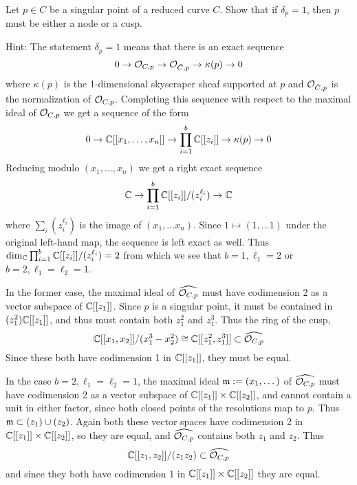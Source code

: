 \begin{exercise}\label{delta=1 characterization}
Let $p \in C$ be a singular point of a reduced curve $C$. Show that if $\delta_p = 1$, then $p$ must be either a node or a cusp.

Hint: The statement $\delta_p = 1$ means that there is an exact sequence
$$
0 \to \cO_{C,p} \to\cO_{\tilde C,p} \to \kappa(p) \to 0
$$
where $\kappa(p)$ is the 1-dimensional skyscraper sheaf supported at $p$ and $\cO_{\tilde C,p}$ is
the normalization of $\cO_{C,p}$. Completing this sequence with respect to the maximal ideal
of $\cO_{C,p}$ we get a sequence of the form
$$
0 \to \CC[[x_1,\dots,x_n]] \to \prod_{i=1}^b \CC[[z_i]] \to \kappa(p) \to 0
$$
Reducing modulo $(x_1,\dots,x_n)$ we get a right exact sequence
$$
\CC \to \prod_{i=1}^b \CC[[z_i]]/(z_i^{\ell_i}) \to \CC
$$
where $\sum_i (z_i^{\ell_i})$ is the image of $(x_1,\dots x_n)$.
Since $1\mapsto (1,...1)$ under the original left-hand map, the sequence is 
left exact as well. Thus
$\dim_\CC \prod_{i=1}^b \CC[[z_i]]/(z_i^{\ell_i})=2$
from which we see that $b=1, \ell_1 = 2$ or $b = 2, \ell_1=\ell_2 = 1$.

In the former case, the maximal ideal of $\widehat{\sO_{C,p}}$ must have codimension
2 as a vector subspace of $\CC[[z_1]]$. Since $p$ is a singular point, it must be contained in
$(z_1^2)\CC[[z_1]]$, and thus must contain both $z_1^2$ and $z_1^3$. Thus the
ring of the cusp, 
$$
\CC[[x_1,x_2]]/(x_1^3-x_2^2) \cong \CC[[z_1^2, z_1^3]]\subset \widehat{\sO_{C,p}}
$$ 
Since these
both have codimension 1 in $\CC[[z_1]]$, they must be equal.

In the case  $b = 2, \ell_1=\ell_2 = 1$, the maximal ideal $\gm := (x_1,\dots)$ of $\widehat{\sO_{C,p}}$ must have codimension
2 as a vector subspace of $\CC[[z_1]]\times \CC[[z_2]] $, and cannot contain a unit in either factor,
since both closed points of the resolutions map to  $p$. Thus $\gm\subset (z_1)\cup (z_2)$. Again
both these vector spaces have codimension 2 in $\CC[[z_1]]\times \CC[[z_2]] $, so they are
equal, and $\widehat{\sO_{C,p}}$ contains both $z_1$ and $z_2$. Thus
$$
\CC[[z_1,z_2]]/(z_1z_2) \subset \widehat{\sO_{C,p}}
$$ 
and since they both have codimension 1 in $\CC[[z_1]]\times \CC[[z_2]] $ they are equal.
\end{exercise}



